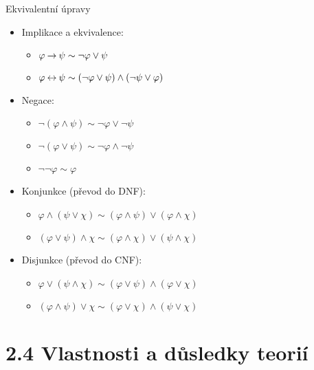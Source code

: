 \documentclass{beamer}
\begin{document}
\begin{frame}{Ekvivalentní úpravy}

    \begin{itemize}
        \item Implikace a ekvivalence:
        \begin{itemize}
            \item[] $\varphi\mathbin{\rightarrow}\psi\sim\neg\varphi\lor\psi$
            \item[] $\varphi\mathbin{\leftrightarrow}\psi\sim(\neg\varphi\lor\psi)\land(\neg\psi\lor\varphi)$
        \end{itemize}
        \item Negace:
        \begin{itemize}
            \item[] $\neg(\varphi\land\psi)\sim\neg\varphi\lor\neg\psi$
            \item[] $\neg(\varphi\lor\psi)\sim\neg\varphi\land\neg\psi$
            \item[] $\neg\neg\varphi\sim\varphi$
        \end{itemize}
        \item Konjunkce (převod do DNF):
        \begin{itemize}
            \item[] $\varphi \land (\psi\lor\chi) \sim (\varphi\land\psi)\lor (\varphi\land\chi)$
            \item[] $(\varphi \lor \psi)\land\chi \sim (\varphi\land\chi)\lor (\psi\land\chi)$
        \end{itemize}
        \item Disjunkce (převod do CNF):
        \begin{itemize}
            \item[] $\varphi \lor (\psi\land\chi) \sim (\varphi\lor\psi)\land (\varphi\lor\chi)$
            \item[] $(\varphi \land \psi)\lor\chi \sim (\varphi\lor\chi)\land (\psi\lor\chi)$
        \end{itemize}
    \end{itemize}

\end{frame}


\section{2.4 Vlastnosti a důsledky teorií}
\end{document}
